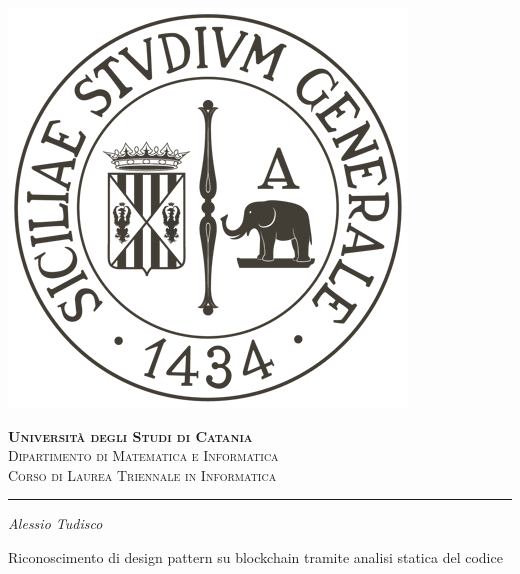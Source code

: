 \begin{titlepage}
	
\centering

\includegraphics[scale=0.25]{components/images/university-logo}

\bigskip

\gdef\@phd@university{
	{\LARGE \bfseries Universit\`{a} degli Studi di Catania}\\ 
	{\large Dipartimento di Matematica e Informatica}\\ 
	{Corso di Laurea Triennale in Informatica}\\
	\bigskip}

\textsc{\@phd@university}\par

\hrule

\bigskip

\bigskip

\bigskip

\bigskip

\bigskip

\bigskip

{\itshape \large
	Alessio Tudisco\par
}

\bigskip

\bigskip

\bigskip

\bigskip

\bigskip

\bigskip

{\Large Riconoscimento di design pattern su blockchain tramite analisi statica del codice}\par


\end{titlepage}
